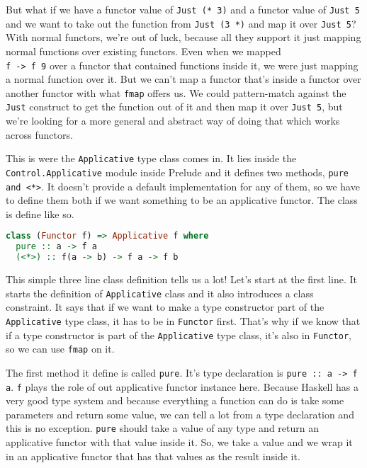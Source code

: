 But what if we have a functor value of \texttt{Just (* 3)} and a functor value of \texttt{Just 5} and we want to take out the function from \texttt{Just (3 *)} and map it over \texttt{Just 5}? With normal functors, we're out of luck, because all they support it just mapping normal functions over existing functors. Even when we mapped \texttt{\\f -> f 9} over a functor that contained functions inside it, we were just mapping a normal function over it. But we can't map a functor that's inside a functor over another functor with what \texttt{fmap} offers us. We could pattern-match against the \texttt{Just} construct to get the function out of it and then map it over \texttt{Just 5}, but we're looking for a more general and abstract way of doing that which works across functors.
\linebreak \linebreak

This is were the \texttt{Applicative} type class comes in. It lies inside the \texttt{Control.Applicative} module inside Prelude and it defines two methods, \texttt{pure and <*>}. It doesn't provide a default implementation for any of them, so we have to define them both if we want something to be an applicative functor. The class is define like so.

\begin{lstlisting}[language=haskell]
class (Functor f) => Applicative f where
  pure :: a -> f a
  (<*>) :: f(a -> b) -> f a -> f b
\end{lstlisting}

This simple three line class definition tells us a lot! Let's start at the first line. It starts the definition of \texttt{Applicative} class and it also introduces a class constraint. It says that if we want to make a type constructor part of the \texttt{Applicative} type class, it has to be in \texttt{Functor} first. That's why if we know that if a type constructor is part of the \texttt{Applicative} type class, it's also in \texttt{Functor}, so we can use \texttt{fmap} on it.
\linebreak \linebreak

The first method it define is called \texttt{pure}. It's type declaration is \texttt{pure :: a -> f a}. \texttt{f} plays the role of out applicative functor instance here. Because Haskell has a very good type system and because everything a function can do is take some parameters and return some value, we can tell a lot from a type declaration and this is no exception. \texttt{pure} should take a value of any type and return an applicative functor with that value inside it. So, we take a value and we wrap it in an applicative functor that has that values as the result inside it. 
\linebreak \linebreak

